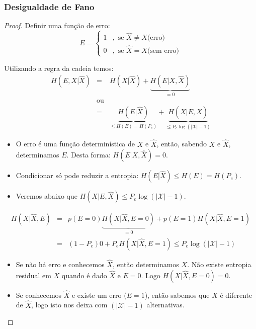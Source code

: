 \begin{frame}[allowframebreaks]
  \frametitle{Desigualdade de Fano}
  \begin{proof}
        Definir uma função de erro:
        \begin{equation}
        E = \begin{cases} 1 &, \text{ se } \hat{X} \neq X \text{(erro)} \\
                0       &, \text{ se } \hat{X} = X \text{(sem erro)} 
        \end{cases}
        \end{equation}

        \proofbreak

        Utilizando a regra da cadeia temos:
        \vspace{-0.3cm}
        \begin{eqnarray}
        H(E,X|\hat{X}) &=& H(X|\hat{X}) + \underbrace{H(E|X,\hat{X})}_{=0} \nonumber \\
                        &\text{ou}& \nonumber \\
                        &=& \underbrace{H(E|\hat{X})}_{\leq H(E) = H(P_e)} + \underbrace{H(X|E,\hat{X})}_{\leq P_e \log (\vert \mathcal{X} \vert - 1)}
        \end{eqnarray}
        \vspace{-0.3cm}
        \begin{itemize}
        \item O erro é uma função determinística de $X$ e $\hat{X}$, então, sabendo $X$ e $\hat{X}$,
                determinamos $E$. Desta forma: $H(E|X,\hat{X})=0$.
        \item Condicionar só pode reduzir a entropia: $H(E|\hat{X}) \leq H(E) = H(P_e)$.
        \item Veremos abaixo que $H(X|E,\hat{X}) \leq P_e \log (\vert \mathcal{X} \vert - 1)$.
        \end{itemize}

        \proofbreak

        \vspace{-0.3cm}
        \begin{eqnarray}
        H(X|\hat{X},E) &=& p(E=0) \underbrace{H(X|\hat{X},E=0)}_{=0} + p(E=1)H(X|\hat{X},E=1) \nonumber \\
                        &=& (1-P_e) 0 + P_e H(X|\hat{X},E=1) \leq P_e \log (\vert \mathcal{X} \vert - 1) \nonumber
        \end{eqnarray}
        \begin{itemize}
        \item Se não há erro e conhecemos $\hat{X}$, então determinamos $X$. Não existe entropia 
                residual em $X$ quando é dado $\hat{X}$ e $E=0$. Logo $H(X|\hat{X},E=0)=0$.
        \item Se conhecemos $\hat{X}$ e existe um erro ($E=1$), então sabemos que
                $X$ é diferente de $\hat{X}$, logo isto nos deixa com $(\vert \mathcal{X} \vert - 1)$
                alternativas.
        \end{itemize}


\end{proof}
\end{frame}
